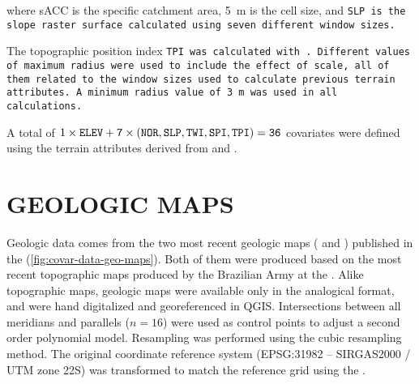 \noindent where sACC is the specific catchment area, \SI{5}{\m} is the cell size, and \tt{SLP} is the slope 
raster surface calculated using seven different window sizes.

The topographic position index \tt{TPI} was calculated with . Different values of 
maximum radius were used to include the effect of scale, all of them related to the window sizes used to 
calculate previous terrain attributes. A minimum radius value of \SI{3}{\m} was used in all calculations.

A total of $1 \times \tt{ELEV} + 7 \times (\tt{NOR}, \tt{SLP}, \tt{TWI}, \tt{SPI}, \tt{TPI}) = 36$ covariates 
were defined using the terrain attributes derived from \demOld{} and \demNew{}.

\section{GEOLOGIC MAPS}
\label{sec:covar-data-geo-maps}

Geologic data comes from the two most recent geologic maps (\geoOld{} and \geoNew{}) published in the 
 \cite{GasparettoEtAl1988, MacielFilho1990} (\autoref{fig:covar-data-geo-maps}). Both of 
them were produced based on the most recent topographic maps produced by the Brazilian Army at the 
 \cite{DSG1980, DSG1992, DSG1992a}. Alike topographic maps, geologic maps were 
available only in the analogical format, and were hand digitalized and georeferenced in QGIS. Intersections 
between all meridians and parallels ($n = 16$) were used as control points to adjust a second order polynomial 
model. Resampling was performed using the cubic resampling method. The original coordinate reference system 
(EPSG:31982 -- SIRGAS2000 / UTM zone 22S) was transformed to match the reference grid using the 
 \cite{BivandEtAl2013a}.

